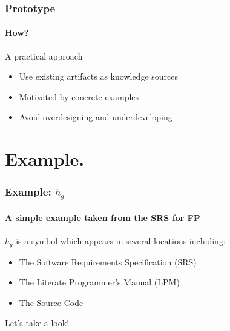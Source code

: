 \documentclass{beamer}
\begin{document}
\begin{frame}

\frametitle{Prototype}
\framesubtitle{How?}

A practical approach

\begin{itemize}
\item Use existing artifacts as knowledge sources 
\item Motivated by concrete examples 
\item Avoid overdesigning and underdeveloping
\end{itemize}
\end{frame}



\section[Example]{Example.}


\begin{frame}

\frametitle{Example: $h_g$}

\framesubtitle{A simple example taken from the SRS for FP}

$h_g$ is a symbol which appears in several locations including:
\begin{itemize}
\item The Software Requirements Specification (SRS)
\item The Literate Programmer's Manual (LPM)
\item The Source Code
\end{itemize}

Let's take a look!

\end{frame}
\end{document}
